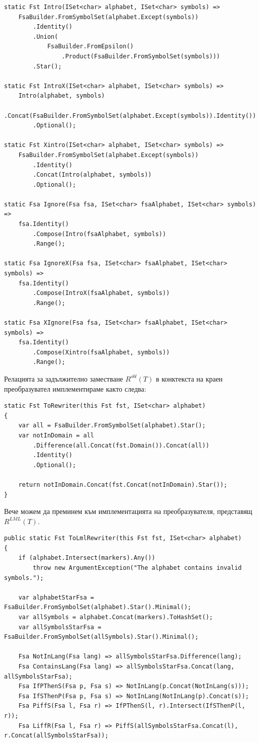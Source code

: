 \documentclass[12pt, oneside]{article}
\theoremstyle{definition}
\begin{document}
\begin{verbatim}
static Fst Intro(ISet<char> alphabet, ISet<char> symbols) =>
	FsaBuilder.FromSymbolSet(alphabet.Except(symbols))
		.Identity()
		.Union(
			FsaBuilder.FromEpsilon()
				.Product(FsaBuilder.FromSymbolSet(symbols)))
		.Star();

static Fst IntroX(ISet<char> alphabet, ISet<char> symbols) =>
	Intro(alphabet, symbols)
		.Concat(FsaBuilder.FromSymbolSet(alphabet.Except(symbols)).Identity())
		.Optional();

static Fst Xintro(ISet<char> alphabet, ISet<char> symbols) =>
	FsaBuilder.FromSymbolSet(alphabet.Except(symbols))
		.Identity()
		.Concat(Intro(alphabet, symbols))
		.Optional();

static Fsa Ignore(Fsa fsa, ISet<char> fsaAlphabet, ISet<char> symbols) =>
    fsa.Identity()
		.Compose(Intro(fsaAlphabet, symbols))
		.Range();

static Fsa IgnoreX(Fsa fsa, ISet<char> fsaAlphabet, ISet<char> symbols) =>
	fsa.Identity()
		.Compose(IntroX(fsaAlphabet, symbols))
		.Range();

static Fsa XIgnore(Fsa fsa, ISet<char> fsaAlphabet, ISet<char> symbols) =>
	fsa.Identity()
		.Compose(Xintro(fsaAlphabet, symbols))
		.Range();
\end{verbatim}

Релацията за задължително заместване \(R^{obl}(T)\) в конктекста на краен преобразувател имплементираме както следва:

\begin{verbatim}
static Fst ToRewriter(this Fst fst, ISet<char> alphabet)
{
	var all = FsaBuilder.FromSymbolSet(alphabet).Star();
	var notInDomain = all
		.Difference(all.Concat(fst.Domain()).Concat(all))
		.Identity()
		.Optional();

	return notInDomain.Concat(fst.Concat(notInDomain).Star());
}
\end{verbatim}

Вече можем да преминем към имплементацията на преобразувателя, представящ \(R^{LML}(T)\).

\begin{verbatim}
public static Fst ToLmlRewriter(this Fst fst, ISet<char> alphabet)
{
	if (alphabet.Intersect(markers).Any())
		throw new ArgumentException("The alphabet contains invalid symbols.");

	var alphabetStarFsa = FsaBuilder.FromSymbolSet(alphabet).Star().Minimal();
	var allSymbols = alphabet.Concat(markers).ToHashSet();
	var allSymbolsStarFsa = FsaBuilder.FromSymbolSet(allSymbols).Star().Minimal();

	Fsa NotInLang(Fsa lang) => allSymbolsStarFsa.Difference(lang);
	Fsa ContainsLang(Fsa lang) => allSymbolsStarFsa.Concat(lang, allSymbolsStarFsa);
	Fsa IfPThenS(Fsa p, Fsa s) => NotInLang(p.Concat(NotInLang(s)));
	Fsa IfSThenP(Fsa p, Fsa s) => NotInLang(NotInLang(p).Concat(s));
	Fsa PiffS(Fsa l, Fsa r) => IfPThenS(l, r).Intersect(IfSThenP(l, r));
	Fsa LiffR(Fsa l, Fsa r) => PiffS(allSymbolsStarFsa.Concat(l), r.Concat(allSymbolsStarFsa));
\end{verbatim}
\end{document}
